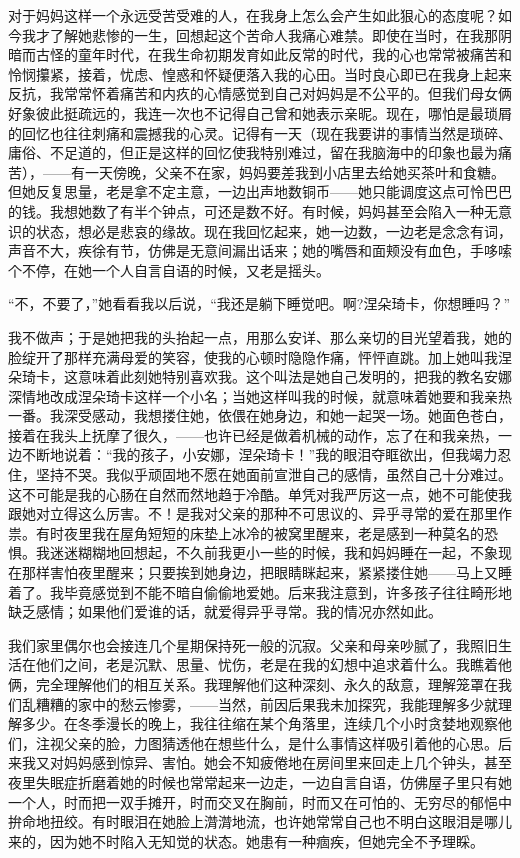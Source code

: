 \documentclass[12pt, UTF8]{ctexbook}
\begin{document}
\par 对于妈妈这样一个永远受苦受难的人，在我身上怎么会产生如此狠心的态度呢？如今我才了解她悲惨的一生，回想起这个苦命人我痛心难禁。即使在当时，在我那阴暗而古怪的童年时代，在我生命初期发育如此反常的时代，我的心也常常被痛苦和怜悯攥紧，接着，忧虑、惶惑和怀疑便落入我的心田。当时良心即已在我身上起来反抗，我常常怀着痛苦和内疚的心情感觉到自己对妈妈是不公平的。但我们母女俩好象彼此挺疏远的，我连一次也不记得自己曾和她表示亲昵。现在，哪怕是最琐屑的回忆也往往刺痛和震撼我的心灵。记得有一天（现在我要讲的事情当然是琐碎、庸俗、不足道的，但正是这样的回忆使我特别难过，留在我脑海中的印象也最为痛苦），——有一天傍晚，父亲不在家，妈妈要差我到小店里去给她买茶叶和食糖。但她反复思量，老是拿不定主意，一边出声地数铜币——她只能调度这点可怜巴巴的钱。我想她数了有半个钟点，可还是数不好。有时候，妈妈甚至会陷入一种无意识的状态，想必是悲哀的缘故。现在我回忆起来，她一边数，一边老是念念有词，声音不大，疾徐有节，仿佛是无意间漏出话来；她的嘴唇和面颊没有血色，手哆嗦个不停，在她一个人自言自语的时候，又老是摇头。
\par “不，不要了，”她看看我以后说，“我还是躺下睡觉吧。啊?涅朵琦卡，你想睡吗？”
\par 我不做声；于是她把我的头抬起一点，用那么安详、那么亲切的目光望着我，她的脸绽开了那样充满母爱的笑容，使我的心顿时隐隐作痛，怦怦直跳。加上她叫我涅朵琦卡，这意味着此刻她特别喜欢我。这个叫法是她自己发明的，把我的教名安娜深情地改成涅朵琦卡这样一个小名；当她这样叫我的时候，就意味着她要和我亲热一番。我深受感动，我想搂住她，依偎在她身边，和她一起哭一场。她面色苍白，接着在我头上抚摩了很久，——也许已经是做着机械的动作，忘了在和我亲热，一边不断地说着：“我的孩子，小安娜，涅朵琦卡！”我的眼泪夺眶欲出，但我竭力忍住，坚持不哭。我似乎顽固地不愿在她面前宣泄自己的感情，虽然自己十分难过。这不可能是我的心肠在自然而然地趋于冷酷。单凭对我严厉这一点，她不可能使我跟她对立得这么厉害。不！是我对父亲的那种不可思议的、异乎寻常的爱在那里作祟。有时夜里我在屋角短短的床垫上冰冷的被窝里醒来，老是感到一种莫名的恐惧。我迷迷糊糊地回想起，不久前我更小一些的时候，我和妈妈睡在一起，不象现在那样害怕夜里醒来；只要挨到她身边，把眼睛眯起来，紧紧搂住她——马上又睡着了。我毕竟感觉到不能不暗自偷偷地爱她。后来我注意到，许多孩子往往畸形地缺乏感情；如果他们爱谁的话，就爱得异乎寻常。我的情况亦然如此。
\par 我们家里偶尔也会接连几个星期保持死一般的沉寂。父亲和母亲吵腻了，我照旧生活在他们之间，老是沉默、思量、忧伤，老是在我的幻想中追求着什么。我瞧着他俩，完全理解他们的相互关系。我理解他们这种深刻、永久的敌意，理解笼罩在我们乱糟糟的家中的愁云惨雾，——当然，前因后果我未加探究，我能理解多少就理解多少。在冬季漫长的晚上，我往往缩在某个角落里，连续几个小时贪婪地观察他们，注视父亲的脸，力图猜透他在想些什么，是什么事情这样吸引着他的心思。后来我又对妈妈感到惊异、害怕。她会不知疲倦地在房间里来回走上几个钟头，甚至夜里失眠症折磨着她的时候也常常起来一边走，一边自言自语，仿佛屋子里只有她一个人，时而把一双手摊开，时而交叉在胸前，时而又在可怕的、无穷尽的郁悒中拚命地扭绞。有时眼泪在她脸上潸潸地流，也许她常常自己也不明白这眼泪是哪儿来的，因为她不时陷入无知觉的状态。她患有一种痼疾，但她完全不予理睬。
\end{document}
